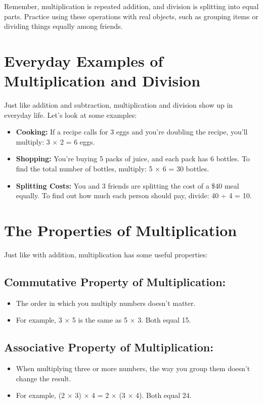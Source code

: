 Remember, multiplication is repeated addition, and division is splitting into equal parts. Practice using these operations with real objects, such as grouping items or dividing things equally among friends.

\section{Everyday Examples of Multiplication and Division}
Just like addition and subtraction, multiplication and division show up in everyday life. Let’s look at some examples:
\begin{itemize}
    \item \textbf{Cooking:} If a recipe calls for 3 eggs and you’re doubling the recipe, you’ll multiply: 3 × 2 = 6 eggs.
    \item \textbf{Shopping:} You’re buying 5 packs of juice, and each pack has 6 bottles. To find the total number of bottles, multiply: 5 × 6 = 30 bottles.
    \item \textbf{Splitting Costs:} You and 3 friends are splitting the cost of a \$40 meal equally. To find out how much each person should pay, divide: 40 ÷ 4 = 10.
\end{itemize}

\section{The Properties of Multiplication}
Just like with addition, multiplication has some useful properties:

\subsection{Commutative Property of Multiplication:}
\begin{itemize}
    \item The order in which you multiply numbers doesn’t matter.
    \item For example, 3 × 5 is the same as 5 × 3. Both equal 15.
\end{itemize}

\subsection{Associative Property of Multiplication:}
\begin{itemize}
    \item When multiplying three or more numbers, the way you group them doesn’t change the result.
    \item For example, (2 × 3) × 4 = 2 × (3 × 4). Both equal 24.
\end{itemize}

